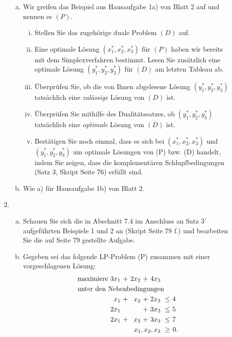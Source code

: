 \documentclass[11pt, a4paper]{article}
\begin{document}
\begin{enumerate}[\bfseries A:]
\begin{enumerate}[\bfseries 1.]
\begin{enumerate}[a)]
\item Wir greifen das Beispiel aus Hausaufgabe 1a) von Blatt 2 auf und nennen es $(P)$.
\begin{enumerate}[(i)]
\item Stellen Sie das zugehörige duale Problem $(D)$ auf.
\item Eine optimale Lösung $(x_1^*, x_2^*, x_3^*)$ für $(P)$ haben wir bereits mit dem Simplexverfahren bestimmt. Lesen Sie zusätzlich eine optimale Lösung $(y_1^*, y_2^*, y_3^*)$ für $(D)$ am letzten Tableau ab.
\item Überprüfen Sie, ob die von Ihnen abgelesene Lösung $(y_1^*, y_2^*, y_3^*)$ tatsächlich eine \textit{zulässige} Lösung von $(D)$ ist.
\item Überprüfen Sie mithilfe des Dualitätssatzes, ob $(y_1^*, y_2^*, y_3^*)$ tatsächlich eine \textit{optimale} Lösung von $(D)$ ist.
\item Bestätigen Sie noch einmal, dass es sich bei $(x_1^*, x_2^*, x_3^*)$ und $(y_1^*, y_2^*, y_3^*)$ um optimale Lösungen von (P) bzw. (D) handelt, indem Sie zeigen, dass die komplementären Schlupfbedingungen (Satz 3, Skript Seite 76) erfüllt sind. 
\end{enumerate}

\item Wie a) für Hausaufgabe 1b) von Blatt 2.

\end{enumerate}


\item \begin{enumerate}[a)]
\item Schauen Sie sich die in Abschnitt 7.4 im Anschluss an Satz 3' aufgeführten Beispiele 1 und 2 an (Skript Seite 78 f.) und bearbeiten Sie die auf Seite 79 gestellte Aufgabe.

\item Gegeben sei das folgende LP-Problem (P) zusammen mit einer vorgeschlagenen Lösung:
\begin{align*}
\begin{alignedat}{5}
& \text{maximiere } & 3x_1 &\ + &\ 2x_2 &\ + &\ 4x_3 & & \\
& \rlap{unter den Nebenbedingungen} & & & & & & & \\
&&   x_1 &\ + &\ x_2 &\ + &\ 2x_3 &\ \leq &\ 4\ \\
&&  2x_1 &\   &\     &\ + &\ 3x_3 &\ \leq &\ 5\ \\
&&  2x_1 &\ + &\ x_2 &\ + &\ 3x_3 &\ \leq &\ 7\ \\
&& &&&& \llap{$x_1,x_2,x_3$} &\ \geq &\ 0.
\end{alignedat}
\end{align*}


\end{enumerate}
\end{enumerate}
\end{enumerate}
\end{document}
